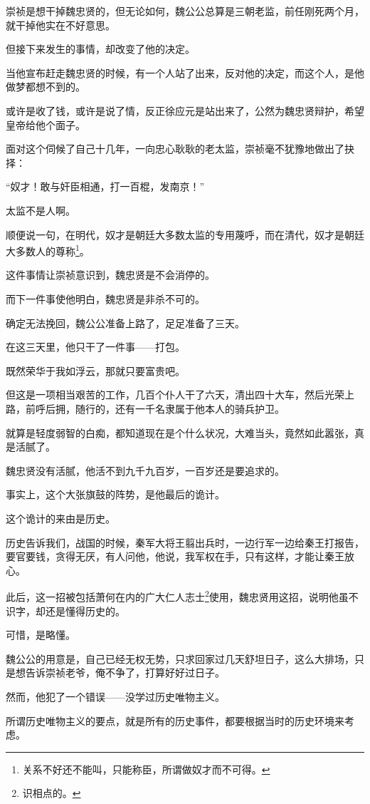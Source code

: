 \begin{multicols}{\theparacolNo}
		崇祯是想干掉魏忠贤的，但无论如何，魏公公总算是三朝老监，前任刚死两个月，就干掉他实在不好意思。

		但接下来发生的事情，却改变了他的决定。

		当他宣布赶走魏忠贤的时候，有一个人站了出来，反对他的决定，而这个人，是他做梦都想不到的。

		或许是收了钱，或许是说了情，反正徐应元是站出来了，公然为魏忠贤辩护，希望皇帝给他个面子。

		面对这个伺候了自己十几年，一向忠心耿耿的老太监，崇祯毫不犹豫地做出了抉择：

		“奴才！敢与奸臣相通，打一百棍，发南京！”

		太监不是人啊。

		顺便说一句，在明代，奴才是朝廷大多数太监的专用蔑呼，而在清代，奴才是朝廷大多数人的尊称\footnote{关系不好还不能叫，只能称臣，所谓做奴才而不可得。}。

		这件事情让崇祯意识到，魏忠贤是不会消停的。

		而下一件事使他明白，魏忠贤是非杀不可的。

		确定无法挽回，魏公公准备上路了，足足准备了三天。

		在这三天里，他只干了一件事——打包。

		既然荣华于我如浮云，那就只要富贵吧。

		但这是一项相当艰苦的工作，几百个仆人干了六天，清出四十大车，然后光荣上路，前呼后拥，随行的，还有一千名隶属于他本人的骑兵护卫。

		就算是轻度弱智的白痴，都知道现在是个什么状况，大难当头，竟然如此嚣张，真是活腻了。

		魏忠贤没有活腻，他活不到九千九百岁，一百岁还是要追求的。

		事实上，这个大张旗鼓的阵势，是他最后的诡计。

		这个诡计的来由是历史。

		历史告诉我们，战国的时候，秦军大将王翦出兵时，一边行军一边给秦王打报告，要官要钱，贪得无厌，有人问他，他说，我军权在手，只有这样，才能让秦王放心。

		此后，这一招被包括萧何在内的广大仁人志士\footnote{识相点的。}使用，魏忠贤用这招，说明他虽不识字，却还是懂得历史的。

		可惜，是略懂。

		魏公公的用意是，自己已经无权无势，只求回家过几天舒坦日子，这么大排场，只是想告诉崇祯老爷，俺不争了，打算好好过日子。

		然而，他犯了一个错误——没学过历史唯物主义。

		所谓历史唯物主义的要点，就是所有的历史事件，都要根据当时的历史环境来考虑。


\end{multicols}
